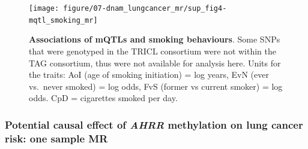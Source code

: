 \documentclass[11pt,twoside]{bristolthesis}
\begin{document}
\begin{figure}[!hp]

{\centering \texttt{[image: figure/07-dnam\_lungcancer\_mr/sup\_fig4-mqtl\_smoking\_mr]} 

}

\caption[Associations of mQTLs and smoking behaviours]{\textbf{Associations of mQTLs and smoking behaviours}. Some SNPs that were genotyped in the TRICL consortium were not within the TAG consortium, thus were not available for analysis here. Units for the traits: AoI (age of smoking initiation) = log years, EvN (ever vs.~never smoked) = log odds, FvS (former vs current smoker) = log odds. CpD = cigarettes smoked per day.}\label{fig:sup-fig4-07}
\end{figure}
\pagebreak

\hypertarget{ahrr-one-sample-mr}{%
\subsubsection{\texorpdfstring{Potential causal effect of \emph{AHRR} methylation on lung cancer risk: one sample MR}{Potential causal effect of AHRR methylation on lung cancer risk: one sample MR}}\label{ahrr-one-sample-mr}}
\end{document}
